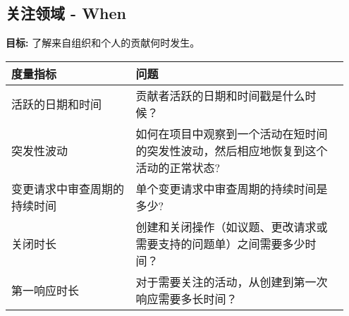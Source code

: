 
    \subsection{关注领域 - When}
    \textbf{目标:} 了解来自组织和个人的贡献何时发生。
    \begin{table}[ht!]
        \centering
        \begin{tabular}{|p{0.35\linewidth} | p{0.6\linewidth}|}
            \hline
            \hfil \textbf{度量指标}  & \hfil \textbf{问题} \\
            \hline
        		活跃的日期和时间 & 贡献者活跃的日期和时间戳是什么时候？ \\ 
		\hline
		突发性波动 & 如何在项目中观察到一个活动在短时间的突发性波动，然后相应地恢复到这个活动的正常状态? \\ 
		\hline
		变更请求中审查周期的持续时间 & 单个变更请求中审查周期的持续时间是多少? \\ 
		\hline
		关闭时长 & 创建和关闭操作（如议题、更改请求或需要支持的问题单）之间需要多少时间？ \\ 
		\hline
		第一响应时长 & 对于需要关注的活动，从创建到第一次响应需要多长时间？ \\ 
		\hline
    \end{tabular}
    \end{table}
        
 
 
 
 
 
